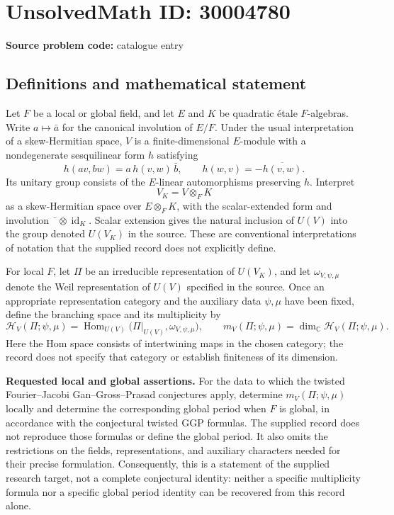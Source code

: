 \documentclass[11pt]{article}
\newcommand{\C}{\mathbb{C}}
\begin{document}
\section*{UnsolvedMath ID: 30004780}
\textbf{Source problem code:} catalogue entry
\subsection{Definitions and mathematical statement}
Let \(F\) be a local or global field, and let \(E\) and \(K\) be quadratic étale \(F\)-algebras. Write \(a\mapsto\bar a\) for the canonical involution of \(E/F\). Under the usual interpretation of a skew-Hermitian space, \(V\) is a finite-dimensional \(E\)-module with a nondegenerate sesquilinear form \(h\) satisfying
\[
 h(av,bw)=a\,h(v,w)\,\bar b,
 \qquad h(w,v)=-\overline{h(v,w)}.
\]
Its unitary group consists of the \(E\)-linear automorphisms preserving \(h\). Interpret
\[
 V_K=V\otimes_F K
\]
as a skew-Hermitian space over \(E\otimes_F K\), with the scalar-extended form and involution \(\bar{\phantom{a}}\otimes\operatorname{id}_K\). Scalar extension gives the natural inclusion of \(U(V)\) into the group denoted \(U(V_K)\) in the source. These are conventional interpretations of notation that the supplied record does not explicitly define.

For local \(F\), let \(\Pi\) be an irreducible representation of \(U(V_K)\), and let \(\omega_{V,\psi,\mu}\) denote the Weil representation of \(U(V)\) specified in the source. Once an appropriate representation category and the auxiliary data \(\psi,\mu\) have been fixed, define the branching space and its multiplicity by
\[
 \mathcal H_V(\Pi;\psi,\mu)
 =\operatorname{Hom}_{U(V)}
 \bigl(\Pi|_{U(V)},\omega_{V,\psi,\mu}\bigr),
 \qquad
 m_V(\Pi;\psi,\mu)
 =\dim_{\C}\mathcal H_V(\Pi;\psi,\mu).
\]
Here the Hom space consists of intertwining maps in the chosen category; the record does not specify that category or establish finiteness of its dimension.

\textbf{Requested local and global assertions.} For the data to which the twisted Fourier--Jacobi Gan--Gross--Prasad conjectures apply, determine \(m_V(\Pi;\psi,\mu)\) locally and determine the corresponding global period when \(F\) is global, in accordance with the conjectural twisted GGP formulas. The supplied record does not reproduce those formulas or define the global period. It also omits the restrictions on the fields, representations, and auxiliary characters needed for their precise formulation. Consequently, this is a statement of the supplied research target, not a complete conjectural identity: neither a specific multiplicity formula nor a specific global period identity can be recovered from this record alone.
\end{document}
